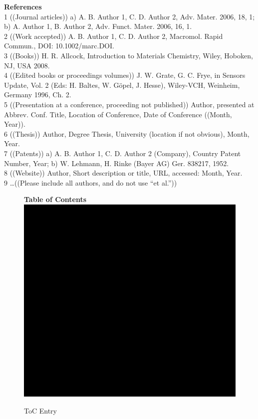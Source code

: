 \documentclass{WileyMSP-template}
\begin{document}
\medskip

%



\textbf{References}\\
1	((Journal articles)) a) A. B. Author 1, C. D. Author 2, Adv. Mater. 2006, 18, 1; b) A. Author 1, B. Author 2, Adv. Funct. Mater. 2006, 16, 1.\\
2	((Work accepted)) A. B. Author 1, C. D. Author 2, Macromol. Rapid Commun., DOI: 10.1002/marc.DOI.\\
3	((Books)) H. R. Allcock, Introduction to Materials Chemistry, Wiley, Hoboken, NJ, USA 2008.\\
4	((Edited books or proceedings volumes)) J. W. Grate, G. C. Frye, in Sensors Update, Vol. 2 (Eds: H. Baltes, W. Göpel, J. Hesse), Wiley-VCH, Weinheim, Germany 1996, Ch. 2.\\
5	((Presentation at a conference, proceeding not published)) Author, presented at Abbrev. Conf. Title, Location of Conference, Date of Conference ((Month, Year)).\\
6	((Thesis)) Author, Degree Thesis, University (location if not obvious), Month, Year.\\
7	((Patents)) a) A. B. Author 1, C. D. Author 2 (Company), Country Patent Number, Year; b) W. Lehmann, H. Rinke (Bayer AG) Ger. 838217, 1952.\\
8	((Website)) Author, Short description or title, URL, accessed: Month, Year.\\
9	…((Please include all authors, and do not use “et al.”))\\




\begin{figure}
\textbf{Table of Contents}\\
\medskip
  \includegraphics{toc-image.png}
  \medskip
  \caption*{ToC Entry}
\end{figure}
\end{document}
